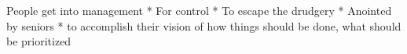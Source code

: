 People get into management
* For control
* To escape the drudgery 
* Anointed by seniors 
* to accomplish their vision of how things should be done, what should be prioritized
